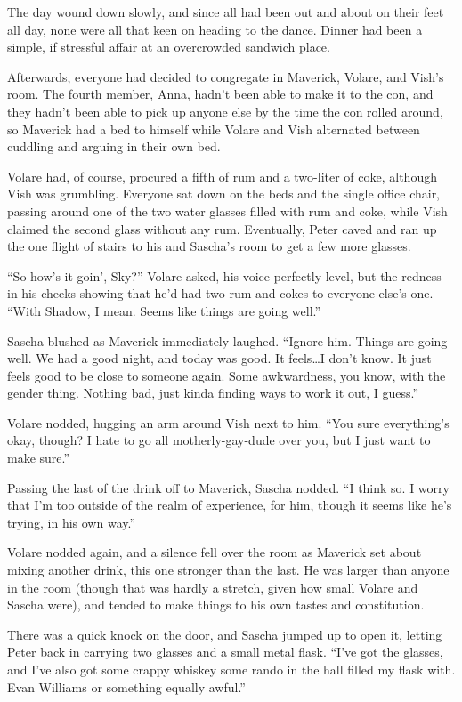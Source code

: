\secdiv

The day wound down slowly, and since all had been out and about on their feet all day, none were all that keen on heading to the dance. Dinner had been a simple, if stressful affair at an overcrowded sandwich place.

Afterwards, everyone had decided to congregate in Maverick, Volare, and Vish's room. The fourth member, Anna, hadn't been able to make it to the con, and they hadn't been able to pick up anyone else by the time the con rolled around, so Maverick had a bed to himself while Volare and Vish alternated between cuddling and arguing in their own bed.

Volare had, of course, procured a fifth of rum and a two-liter of coke, although Vish was grumbling. Everyone sat down on the beds and the single office chair, passing around one of the two water glasses filled with rum and coke, while Vish claimed the second glass without any rum. Eventually, Peter caved and ran up the one flight of stairs to his and Sascha's room to get a few more glasses.

``So how's it goin', Sky?'' Volare asked, his voice perfectly level, but the redness in his cheeks showing that he'd had two rum-and-cokes to everyone else's one. ``With Shadow, I mean. Seems like things are going well.''

Sascha blushed as Maverick immediately laughed. ``Ignore him. Things are going well. We had a good night, and today was good. It feels\ldots{}I don't know. It just feels good to be close to someone again. Some awkwardness, you know, with the gender thing. Nothing bad, just kinda finding ways to work it out, I guess.''

Volare nodded, hugging an arm around Vish next to him. ``You sure everything's okay, though? I hate to go all motherly-gay-dude over you, but I just want to make sure.''

Passing the last of the drink off to Maverick, Sascha nodded. ``I think so. I worry that I'm too outside of the realm of experience, for him, though it seems like he's trying, in his own way.''

Volare nodded again, and a silence fell over the room as Maverick set about mixing another drink, this one stronger than the last. He was larger than anyone in the room (though that was hardly a stretch, given how small Volare and Sascha were), and tended to make things to his own tastes and constitution.

There was a quick knock on the door, and Sascha jumped up to open it, letting Peter back in carrying two glasses and a small metal flask. ``I've got the glasses, and I've also got some crappy whiskey some rando in the hall filled my flask with. Evan Williams or something equally awful.''

